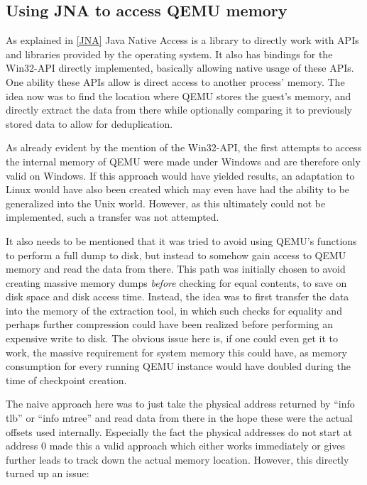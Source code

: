 \subsection{Using JNA to access QEMU memory}\label{sec:JNA_failure}
As explained in \autoref{JNA} Java Native Access is a library to directly work with APIs and libraries provided by the operating system.
It also has bindings for the Win32-API directly implemented,
basically allowing native usage of these APIs.
One ability these APIs allow is direct access to another process' memory.
The idea now was to find the location where QEMU stores the guest's memory,
and directly extract the data from there while optionally comparing it to previously stored data
to allow for deduplication.

As already evident by the mention of the Win32-API,
the first attempts to access the internal memory of QEMU were made under Windows
and are therefore only valid on Windows.
If this approach would have yielded results,
an adaptation to Linux would have also been created
which may even have had the ability to be generalized into the Unix world.
However, as this ultimately could not be implemented,
such a transfer was not attempted.

It also needs to be mentioned that it was tried to avoid using QEMU's functions to perform a full dump to disk,
but instead to somehow gain access to QEMU memory and read the data from there.
This path was initially chosen to avoid creating massive memory dumps \emph{before} checking for equal contents,
to save on disk space and disk access time.
Instead, the idea was to first transfer the data into the memory of the extraction tool,
in which such checks for equality and perhaps further compression could have been realized
before performing an expensive write to disk.
The obvious issue here is, if one could even get it to work,
the massive requirement for system memory this could have,
as memory consumption for every running QEMU instance would have doubled
during the time of checkpoint creation.

The naive approach here was to just take the physical address returned by \enquote{info tlb} or \enquote{info mtree}
and read data from there in the hope these were the actual offsets used internally.
Especially the fact the physical addresses do not start at address 0 made this a valid approach
which either works immediately or gives further leads to track down the actual memory location.
However, this directly turned up an issue:

